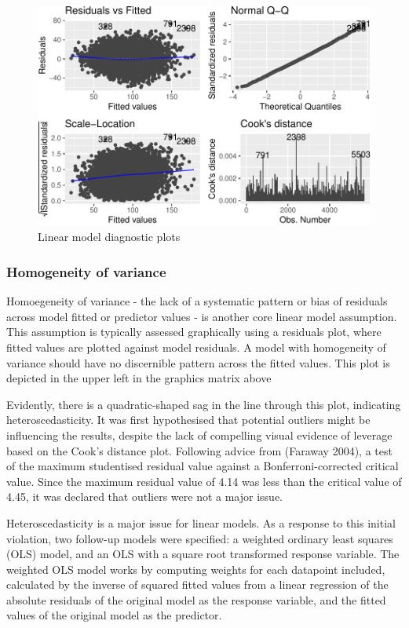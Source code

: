 \documentclass{article}
\begin{document}
\begin{figure}
\centering
\includegraphics{OLET5608_TrentHenderson_files/figure-latex/unnamed-chunk-5-1.pdf}
\caption{Linear model diagnostic plots}
\end{figure}

\hypertarget{homogeneity-of-variance}{%
\subsubsection{Homogeneity of variance}\label{homogeneity-of-variance}}

Homoegeneity of variance - the lack of a systematic pattern or bias of
residuals across model fitted or predictor values - is another core
linear model assumption. This assumption is typically assessed
graphically using a residuals plot, where fitted values are plotted
against model residuals. A model with homogeneity of variance should
have no discernible pattern across the fitted values. This plot is
depicted in the upper left in the graphics matrix above

Evidently, there is a quadratic-shaped sag in the line through this
plot, indicating heteroscedasticity. It was first hypothesised that
potential outliers might be influencing the results, despite the lack of
compelling visual evidence of leverage based on the Cook's distance
plot. Following advice from (Faraway 2004), a test of the maximum
studentised residual value against a Bonferroni-corrected critical
value. Since the maximum residual value of 4.14 was less than the
critical value of 4.45, it was declared that outliers were not a major
issue.

Heteroscedasticity is a major issue for linear models. As a response to
this initial violation, two follow-up models were specified: a weighted
ordinary least squares (OLS) model, and an OLS with a square root
transformed response variable. The weighted OLS model works by computing
weights for each datapoint included, calculated by the inverse of
squared fitted values from a linear regression of the absolute residuals
of the original model as the response variable, and the fitted values of
the original model as the predictor.
\end{document}
